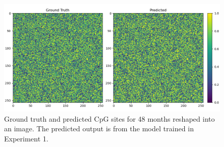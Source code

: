 \documentclass[twocolumn, 9pt]{extarticle}
\begin{document}
\begin{figure}
  \centering
  \includegraphics[width=\columnwidth]{unet_pred.png}
  \caption{Ground truth and predicted CpG sites for 48 months reshaped into an image. The predicted output is from the model trained in Experiment 1.}
  \label{fig:unet_pred}
\end{figure}



\end{document}
